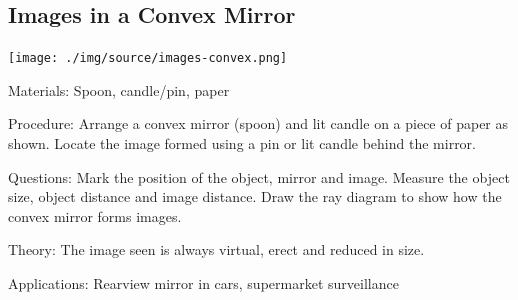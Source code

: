 \begin{multicols}{2}
\subsection{Images in a Convex Mirror}

\begin{center}
\texttt{[image: ./img/source/images-convex.png]}
\end{center}

\begin{description*}
\item[Materials:]{Spoon, candle/pin, paper}
\item[Procedure:]{Arrange a convex mirror (spoon) and lit candle on a piece of paper as shown. Locate the image formed using a pin or lit candle behind the mirror.}
\item[Questions:]{Mark the position of the object, mirror and image. Measure the object size, object distance and image distance. Draw the ray diagram to show how the convex mirror forms images.}
\item[Theory:]{The image seen is always virtual, erect and reduced in size.}
\item[Applications:]{Rearview mirror in cars, supermarket surveillance}
\end{description*}

%
%


\end{multicols}
